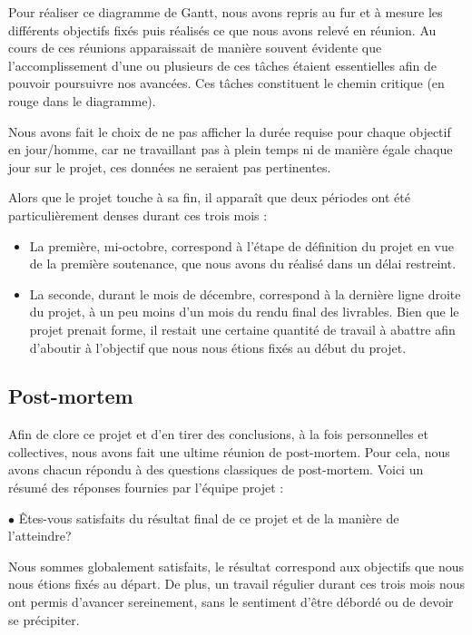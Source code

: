 \documentclass[11pt]{article}
\begin{document}
 Pour réaliser ce diagramme de Gantt, nous avons repris au fur et à mesure les différents objectifs fixés puis réalisés ce que nous avons relevé en réunion. Au cours de ces réunions apparaissait de manière souvent évidente que l'accomplissement d'une ou plusieurs de ces tâches étaient essentielles afin de pouvoir poursuivre nos avancées. Ces tâches constituent le chemin critique (en rouge dans le diagramme). 
 
 Nous avons fait le choix de ne pas afficher la durée requise pour chaque objectif en jour/homme, car ne travaillant pas à plein temps ni de manière égale chaque jour sur le projet, ces données ne seraient pas pertinentes.
 
 Alors que le projet touche à sa fin, il apparaît que deux périodes ont été particulièrement denses durant ces trois mois : 
 \begin{itemize}
     \item La première, mi-octobre, correspond à l'étape de définition du projet en vue de la première soutenance, que nous avons du réalisé dans un délai restreint.
     \item La seconde, durant le mois de décembre, correspond à la dernière ligne droite du projet, à un peu moins d'un mois du rendu final des livrables. Bien que le projet prenait forme, il restait une certaine quantité de travail à abattre afin d'aboutir à l'objectif que nous nous étions fixés au début du projet. 
 \end{itemize}

\subsection{Post-mortem}

Afin de clore ce projet et d'en tirer des conclusions, à la fois personnelles et collectives, nous avons fait une ultime réunion de post-mortem. Pour cela, nous avons chacun répondu à des questions classiques de post-mortem. Voici un résumé des réponses fournies par l'équipe projet : \\

\newpage %


$\bullet$ Êtes-vous satisfaits du résultat final de ce projet et de la manière de l'atteindre? 

Nous sommes globalement satisfaits, le résultat correspond aux objectifs que nous nous étions fixés au départ. De plus, un travail régulier durant ces trois mois nous ont permis d'avancer sereinement, sans le sentiment d'être débordé ou de devoir se précipiter. \\
\end{document}
